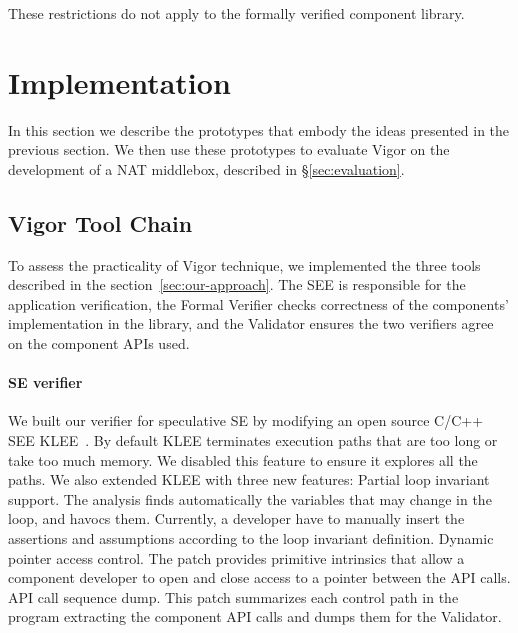 \documentclass[letterpaper,twocolumn,10pt]{article}
\begin{document}
These restrictions do not apply to the formally verified component library. 



\section{Implementation}
\label{sec:implementation}

In this section we describe the prototypes that embody the ideas presented in
the previous section. We then use these prototypes to evaluate Vigor on the
development of a NAT middlebox, described in \S\ref{sec:evaluation}.

\subsection{Vigor Tool Chain}

To assess the practicality of Vigor technique, we implemented the three tools
described in the section~\ref{sec:our-approach}. The SEE is responsible for the
application verification, the Formal Verifier checks correctness of the
components’ implementation in the library, and the Validator ensures the two
verifiers agree on the component APIs used.

\paragraph{SE verifier} We built our verifier for speculative SE by modifying an
open source C/C++ SEE KLEE~\cite{cadar2008klee}. By default KLEE terminates
execution paths that are too long or take too much memory. We disabled this
feature to ensure it explores all the paths. We also extended KLEE with three
new features: Partial loop invariant support. The analysis finds automatically
the variables that may change in the loop, and havocs them. Currently, a
developer have to manually insert the assertions and assumptions according to
the loop invariant definition. Dynamic pointer access control. The patch
provides primitive intrinsics that allow a component developer to open and close
access to a pointer between the API calls. API call sequence dump. This patch
summarizes each control path in the program extracting the component API calls
and dumps them for the Validator.
\end{document}
